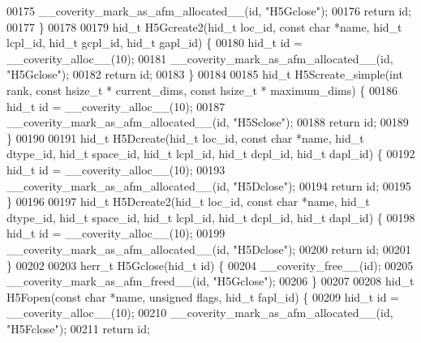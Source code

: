 \begin{DoxyCode}
00175     \_\_coverity\_mark\_as\_afm\_allocated\_\_(\textcolor{keywordtype}{id}, \textcolor{stringliteral}{"H5Gclose"});
00176     \textcolor{keywordflow}{return} id;
00177 \}
00178 
00179 hid\_t H5Gcreate2(hid\_t loc\_id, \textcolor{keyword}{const} \textcolor{keywordtype}{char} *name, hid\_t lcpl\_id, hid\_t gcpl\_id, hid\_t gapl\_id) \{
00180     hid\_t \textcolor{keywordtype}{id} = \_\_coverity\_alloc\_\_(10);
00181     \_\_coverity\_mark\_as\_afm\_allocated\_\_(\textcolor{keywordtype}{id}, \textcolor{stringliteral}{"H5Gclose"});
00182     \textcolor{keywordflow}{return} id;
00183 \}
00184 
00185 hid\_t H5Screate\_simple(\textcolor{keywordtype}{int} rank, \textcolor{keyword}{const} hsize\_t * current\_dims, \textcolor{keyword}{const} hsize\_t * maximum\_dims) \{
00186     hid\_t \textcolor{keywordtype}{id} = \_\_coverity\_alloc\_\_(10);
00187     \_\_coverity\_mark\_as\_afm\_allocated\_\_(\textcolor{keywordtype}{id}, \textcolor{stringliteral}{"H5Sclose"});
00188     \textcolor{keywordflow}{return} id;
00189 \}
00190 
00191 hid\_t H5Dcreate(hid\_t loc\_id, \textcolor{keyword}{const} \textcolor{keywordtype}{char} *name, hid\_t dtype\_id, hid\_t space\_id, hid\_t lcpl\_id, hid\_t 
      dcpl\_id, hid\_t dapl\_id) \{
00192     hid\_t \textcolor{keywordtype}{id} = \_\_coverity\_alloc\_\_(10);
00193     \_\_coverity\_mark\_as\_afm\_allocated\_\_(\textcolor{keywordtype}{id}, \textcolor{stringliteral}{"H5Dclose"});
00194     \textcolor{keywordflow}{return} id;
00195 \}
00196 
00197 hid\_t H5Dcreate2(hid\_t loc\_id, \textcolor{keyword}{const} \textcolor{keywordtype}{char} *name, hid\_t dtype\_id, hid\_t space\_id, hid\_t lcpl\_id, hid\_t 
      dcpl\_id, hid\_t dapl\_id) \{
00198     hid\_t \textcolor{keywordtype}{id} = \_\_coverity\_alloc\_\_(10);
00199     \_\_coverity\_mark\_as\_afm\_allocated\_\_(\textcolor{keywordtype}{id}, \textcolor{stringliteral}{"H5Dclose"});
00200     \textcolor{keywordflow}{return} id;
00201 \}
00202 
00203 herr\_t H5Gclose(hid\_t \textcolor{keywordtype}{id}) \{
00204     \_\_coverity\_free\_\_(\textcolor{keywordtype}{id});
00205     \_\_coverity\_mark\_as\_afm\_freed\_\_(\textcolor{keywordtype}{id}, \textcolor{stringliteral}{"H5Gclose"});
00206 \}
00207 
00208 hid\_t H5Fopen(\textcolor{keyword}{const} \textcolor{keywordtype}{char} *name, \textcolor{keywordtype}{unsigned} flags, hid\_t fapl\_id) \{
00209     hid\_t \textcolor{keywordtype}{id} = \_\_coverity\_alloc\_\_(10);
00210     \_\_coverity\_mark\_as\_afm\_allocated\_\_(\textcolor{keywordtype}{id}, \textcolor{stringliteral}{"H5Fclose"});
00211     \textcolor{keywordflow}{return} id;

\end{DoxyCode}
